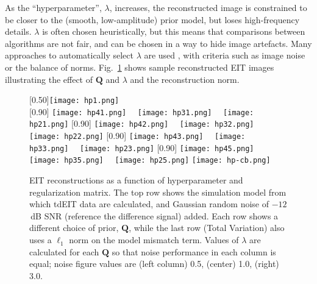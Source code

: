 \documentclass[10pt,journal]{IEEEtran}\def\TBLWIDA{15mm}\def\TBLWIDB{60mm}
\newcommand\Fref[1]{Fig.\ \ref{#1}}
\newcommand{\QB}{\mathbf{Q}}
\begin{document}
As the ``hyperparameter'', $\lambda$,
increases, the reconstructed image is constrained to be closer to
the (smooth, low-amplitude) prior model, but loses high-frequency
details. $\lambda$ is often chosen heuristically, but this means
that comparisons between algorithms are not fair, and can be
chosen in a way to hide image artefacts. Many approaches to automatically
select $\lambda$ are used \cite{Braun2017Hyperparameter}, with
criteria such as image noise or the balance of norms.
\Fref{fig:regularization_comparison} shows sample reconstructed
EIT images illustrating the effect of $\QB$ and $\lambda$ and
the reconstruction norm.

\begin{figure} \centering
% 
   [0.50\columnwidth]{\texttt{[image: hp1.png]}}\\
   [0.90\columnwidth]{%
      \texttt{[image: hp41.png]}~~%
      \texttt{[image: hp31.png]}~~%
      \texttt{[image: hp21.png]}}\hfil%
   [0.90\columnwidth]{%
      \texttt{[image: hp42.png]}~~%
      \texttt{[image: hp32.png]}~~%
      \texttt{[image: hp22.png]}}\hfil%
   [0.90\columnwidth]{%
      \texttt{[image: hp43.png]}~~%
      \texttt{[image: hp33.png]}~~%
      \texttt{[image: hp23.png]}}\hfil%
   [0.90\columnwidth]{%
      \texttt{[image: hp45.png]}~~%
      \texttt{[image: hp35.png]}~~%
      \texttt{[image: hp25.png]}}\hfil%
   \centering \texttt{[image: hp-cb.png]}\\
\caption{%
EIT reconstructions as a function of hyperparameter
and regularization matrix. The top row shows the simulation model
from which tdEIT data are calculated, and Gaussian random noise
of $-12$\,dB SNR (reference the difference signal) added.
Each row shows a different choice of prior, $\QB$, while the
last row (Total Variation) also uses a $\ell_1$ norm on the model mismatch term.
Values of $\lambda$ are calculated for each $\QB$ so that noise performance
in each column is equal; noise figure values are (left column) 0.5,
(center) 1.0, 
(right) 3.0.
}
\label{fig:regularization_comparison}
\end{figure}
\end{document}
